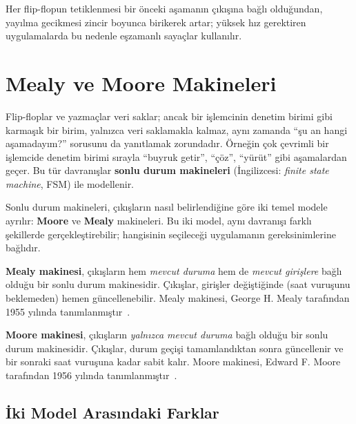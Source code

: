 Her flip-flopun tetiklenmesi bir önceki aşamanın çıkışına bağlı olduğundan, yayılma gecikmesi zincir boyunca birikerek artar; yüksek hız gerektiren uygulamalarda bu nedenle eşzamanlı sayaçlar kullanılır.


\section{Mealy ve Moore Makineleri}

Flip-floplar ve yazmaçlar veri saklar; ancak bir işlemcinin denetim birimi gibi karmaşık bir birim, yalnızca veri saklamakla kalmaz, aynı zamanda ``şu an hangi aşamadayım?'' sorusunu da yanıtlamak zorundadır. Örneğin çok çevrimli bir işlemcide denetim birimi sırayla ``buyruk getir'', ``çöz'', ``yürüt'' gibi aşamalardan geçer. Bu tür davranışlar \textbf{sonlu durum makineleri} (İngilizcesi: \emph{finite state machine}, FSM) ile modellenir.

Sonlu durum makineleri, çıkışların nasıl belirlendiğine göre iki temel modele ayrılır: \textbf{Moore} ve \textbf{Mealy} makineleri. Bu iki model, aynı davranışı farklı şekillerde gerçekleştirebilir; hangisinin seçileceği uygulamanın gereksinimlerine bağlıdır.

\begin{tanim}
\textbf{Mealy makinesi}, çıkışların hem \emph{mevcut duruma} hem de \emph{mevcut girişlere} bağlı olduğu bir sonlu durum makinesidir. Çıkışlar, girişler değiştiğinde (saat vuruşunu beklemeden) hemen güncellenebilir. Mealy makinesi, George H. Mealy tarafından 1955 yılında tanımlanmıştır~\cite{mealy1955}.
\end{tanim}

\begin{tanim}
\textbf{Moore makinesi}, çıkışların \emph{yalnızca mevcut duruma} bağlı olduğu bir sonlu durum makinesidir. Çıkışlar, durum geçişi tamamlandıktan sonra güncellenir ve bir sonraki saat vuruşuna kadar sabit kalır. Moore makinesi, Edward F. Moore tarafından 1956 yılında tanımlanmıştır~\cite{moore1956}.
\end{tanim}

\subsection{İki Model Arasındaki Farklar}

